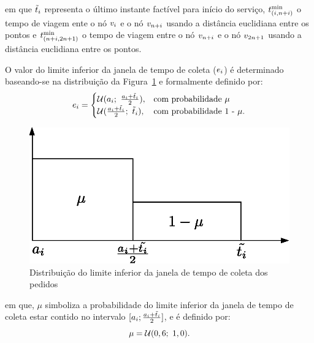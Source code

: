 \noindent em que $\Tilde{t}_i$ representa o último instante factível 
para início do serviço,
$t_{(i,n + i)}^{\min}$ o tempo de
viagem ente o nó $v_{i}$ e o nó $v_{n + i}$ usando a distância 
euclidiana entre os pontos e
$t_{(n + i,2n + 1)}^{\min}$ o tempo de viagem entre 
o nó $v_{n + i}$ e o nó $v_{2n + 1}$ usando a distância euclidiana entre 
os pontos.


O valor do limite inferior da janela de tempo de coleta
($e_i$) é determinado baseando-se na 
distribuição da Figura~\ref{fig:gendreau2006_distribution} e formalmente 
definido por:
%
\begin{equation}
  e_i = 
    \begin{cases}
      \mathcal{U}(a_i;\ \frac{a_i + \Tilde{t}_i}{2}), 
        & \text{com probabilidade $\mu$} \\
      \mathcal{U}(\frac
        {a_i + \Tilde{t}_i}{2};\ \Tilde{t}_i), 
        & \text{com probabilidade 1 - $\mu$}.
      \end{cases}
\label{eq:gendreau2006_earliestTimewindow}
\end{equation}

\begin{figure}[h]
    \centering
    \includegraphics{fig/gendreau2006_distribution.eps}
    \caption{Distribuição do limite inferior da janela de tempo de coleta dos
             pedidos \cite{gendreau_neighborhood_2006}}
    \label{fig:gendreau2006_distribution}
\end{figure}

\noindent em que, $\mu$ simboliza a probabilidade do limite inferior da janela 
de tempo de coleta estar contido no intervalo $[a_i; 
\frac{a_i + \Tilde{t}_i}{2}]$, e é definido por:
%
\begin{equation}
  \mu = \mathcal{U}(0,6;\ 1,0).
\end{equation}

